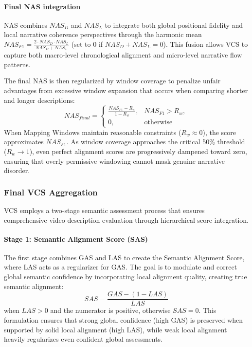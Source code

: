 \documentclass[main.tex]{subfiles}
\begin{document}
\paragraph{Final NAS integration}
NAS combines $NAS_D$ and $NAS_L$ to integrate both global positional fidelity and local narrative coherence perspectives through the harmonic mean $NAS_{F1} = \frac{2 \cdot NAS_D \cdot NAS_L}{NAS_D + NAS_L}$ (set to 0 if $NAS_D + NAS_L = 0$). This fusion allows VCS to capture both macro-level chronological alignment and micro-level narrative flow patterns.

The final NAS is then regularized by window coverage to penalize unfair advantages from excessive window expansion that occurs when comparing shorter and longer descriptions:
\begin{equation}
\boxed{NAS_{final} = \begin{cases}
\frac{NAS_{F1} - R_w}{1 - R_w}, & NAS_{F1} > R_w, \\
0, & \text{otherwise}
\end{cases}}
\end{equation}
When Mapping Windows maintain reasonable constraints ($R_w \approx 0$), the score approximates $NAS_{F1}$. As window coverage approaches the critical 50\% threshold ($R_w \to 1$), even perfect alignment scores are progressively dampened toward zero, ensuring that overly permissive windowing cannot mask genuine narrative disorder.


\subsubsection{Final VCS Aggregation}
VCS employs a two-stage semantic assessment process that ensures comprehensive video description evaluation through hierarchical score integration.

\paragraph{Stage 1: Semantic Alignment Score (SAS)}
The first stage combines GAS and LAS to create the Semantic Alignment Score, where LAS acts as a regularizer for GAS. The goal is to modulate and correct global semantic confidence by incorporating local alignment quality, creating true semantic alignment:
\begin{equation} \label{eq:sas_revised} 
SAS = \frac{GAS - (1 - LAS)}{LAS}
\end{equation}
when $LAS > 0$ and the numerator is positive, otherwise $SAS = 0$. This formulation ensures that strong global confidence (high GAS) is preserved when supported by solid local alignment (high LAS), while weak local alignment heavily regularizes even confident global assessments.
\end{document}
